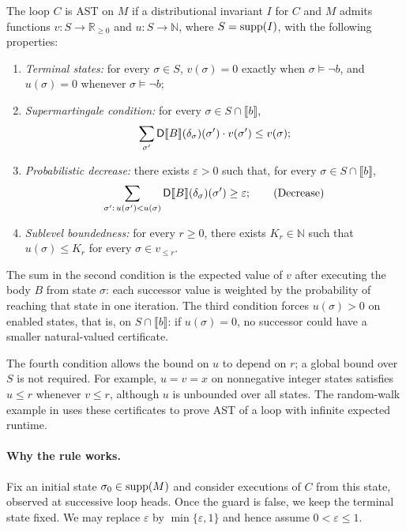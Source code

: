 \begin{theorem}
\label{thm:program-rule}
The loop $C$ is AST on $M$ if a distributional invariant $I$ for $C$
and $M$ admits functions $v:S\to\mathbb R_{\geq0}$ and
$u:S\to\mathbb N$, where $S=\textnormal{supp}(I)$, with the following properties:
\begin{enumerate}
 \item \emph{Terminal states:} for every $\sigma\in S$,
 $v(\sigma)=0$ exactly when $\sigma\models\neg b$, and
 $u(\sigma)=0$ whenever $\sigma\models\neg b$;
 \item \emph{Supermartingale condition:} for every
 $\sigma\in S\cap\llbracket b\rrbracket$,
 \[
   \sum_{\sigma'}\mathsf{D}\llbracket B\rrbracket(\delta_{\sigma})(\sigma')\cdot v(\sigma')
     \leq v(\sigma);
 \]
 \item \emph{Probabilistic decrease:} there exists $\varepsilon>0$
 such that, for every $\sigma\in S\cap\llbracket b\rrbracket$,
 \[
   \sum_{\sigma':\,u(\sigma')<u(\sigma)}
      \mathsf{D}\llbracket B\rrbracket(\delta_{\sigma})(\sigma')\geq\varepsilon;
   \tag{Decrease}
 \]
 \item \emph{Sublevel boundedness:} for every $r\geq0$, there exists
 $K_r\in\mathbb N$ such that $u(\sigma)\leq K_r$ for every
 $\sigma\in v_{\leq r}$.
\end{enumerate}
\end{theorem}
The sum in the second condition is the expected value of $v$ after
executing the body $B$ from state $\sigma$: each successor value is
weighted by the probability of reaching that state in one iteration.
The third condition forces $u(\sigma)>0$ on enabled states, that is, on
$S\cap\llbracket b\rrbracket$: if $u(\sigma)=0$, no successor could
have a smaller natural-valued certificate.

The fourth condition allows the bound on $u$ to depend on $r$; a global
bound over $S$ is not required. For example, $u=v=x$ on nonnegative
integer states satisfies $u\leq r$ whenever $v\leq r$, although $u$
is unbounded over all states. The random-walk example in
 uses these certificates to prove AST of a loop
with infinite expected runtime.

\paragraph{Why the rule works.}
Fix an initial state $\sigma_0\in\textnormal{supp}(M)$ and consider executions of
$C$ from this state, observed at successive loop heads. Once the guard
is false, we keep the terminal state fixed.
We may replace $\varepsilon$ by $\min\{\varepsilon,1\}$ and hence assume
$0<\varepsilon\leq1$.

